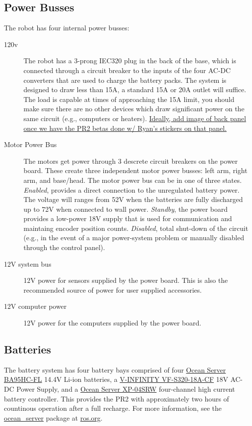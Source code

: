 \subsection{Power Busses}
The robot has four internal power busses:
\begin{description}
\item[120v] The robot has a 3-prong IEC320 plug in the back of the base, which is connected through a circuit breaker to the inputs of the four AC-DC converters that are used to charge the battery packs.  The system is designed to draw less than 15A, a standard 15A or 20A outlet will suffice. The load is capable at times of approaching the 15A limit, you should make sure there are no other devices which draw significant power on the same circuit (e.g., computers or heaters).
\underline{Ideally, add image of back panel once we have the PR2 betas done w/ Ryan's stickers on that panel.}
\item[Motor Power Bus] The motors get power through 3 descrete circuit breakers on the power board. 
These create three independent motor power busses: left arm, right arm, and base/head.
The motor power bus can be in one of three states.  
\emph{Enabled}, provides a direct connection to the unregulated battery power. The voltage will ranges from 52V when the batteries are fully discharged up to 72V when connected to wall power.  
\emph{Standby}, the power board provides a low-power 18V supply that is used for communication and maintaing encoder position counts.  
\emph{Disabled}, total shut-down of the circuit (e.g., in the event of a major power-system problem or manually disabled through the control panel).
\item[12V system bus]
12V power for sensors supplied by the power board. This is also the recommended source of power for user supplied accessories.
\item[12V computer power]
12V power for the computers supplied by the power board.
\end{description}
\subsection{Batteries}
The battery system has four battery bays comprised of four \href{http://www.oceanserver-store.com/18.html}{Ocean Server BA95HC-FL}
14.4V Li-ion batteries, a \href{http://www.v-infinity.com/adtemplate_child.asp?c=710918&p=903285&catky=764537&subcatky1=46887&subcatky2=320934}{V-INFINITY VF-S320-18A-CF}
18V AC-DC Power Supply, and a \href{http://www.oceanserver-store.com/xpmibamamo.html}{Ocean Server XP-04SRW} four-channel high 
current battery controller. This provides the PR2 with approximately two hours of countinous operation after a full recharge. 
For more information, see the \href{http://www.ros.org/wiki/ocean\_server}{ocean\_server} package at \href{http://www.ros.org}{ros.org}.

